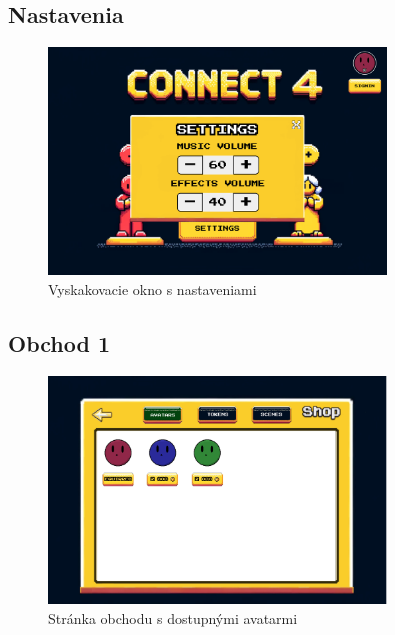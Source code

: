 \documentclass[a4paper, 11pt, onecolumn]{article}
\begin{document}
\subsection*{Nastavenia}
\begin{figure}[H]
  \centering
  \includegraphics[width=0.8\textwidth]{Settings.png}
  \caption{Vyskakovacie okno s nastaveniami}
  \label{fig:settings}
\end{figure}

\subsection*{Obchod 1}
\begin{figure}[H]
  \centering
  \includegraphics[width=0.8\textwidth]{ShopAvatars.png}
  \caption{Stránka obchodu s dostupnými avatarmi}
  \label{fig:shopAvatars}
\end{figure}
\end{document}
